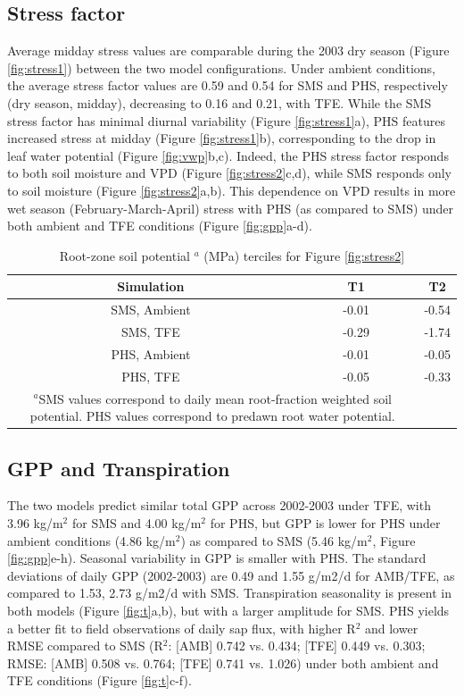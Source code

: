 \documentclass[draft,linenumbers]{agujournal}
\begin{document}
\subsection{Stress factor}
    
    Average midday stress values are comparable during the 2003 dry season (Figure \ref{fig:stress1}) between the two model configurations.
    Under ambient conditions, the average stress factor values are 0.59 and 0.54 for SMS and PHS, respectively (dry season, midday), 
    decreasing to 0.16 and 0.21, with TFE.
    While the SMS stress factor has minimal diurnal variability (Figure \ref{fig:stress1}a),
    PHS features increased stress at midday (Figure \ref{fig:stress1}b), corresponding to the drop in leaf water potential (Figure \ref{fig:vwp}b,c).
    Indeed, the PHS stress factor responds to both soil moisture and VPD (Figure \ref{fig:stress2}c,d), while SMS responds only to soil moisture (Figure \ref{fig:stress2}a,b).
    This dependence on VPD results in more wet season (February-March-April) stress with PHS (as compared to SMS) under both ambient and TFE conditions (Figure \ref{fig:gpp}a-d).

\begin{table}
\caption{Root-zone soil potential $^a$ (MPa) terciles for Figure \ref{fig:stress2}}
\label{tab:tercile}
\centering
\begin{tabular}{c c c }
Simulation & T1 & T2 \\
\hline
SMS, Ambient & -0.01 & -0.54 \\
SMS, TFE & -0.29 & -1.74 \\
PHS, Ambient & -0.01 & -0.05 \\
PHS, TFE & -0.05 & -0.33 \\
\hline
\multicolumn{2}{p{.5\linewidth}}{$^{a}$SMS values correspond to daily mean root-fraction weighted soil potential.
PHS values correspond to predawn root water potential.}
\end{tabular}
\end{table}


\subsection{GPP and Transpiration}
    The two models predict similar total GPP across 2002-2003 under TFE, with 3.96 kg/m$^2$ for SMS and 4.00 kg/m$^2$ for PHS, 
    but GPP is lower for PHS under ambient conditions (4.86 kg/m$^2$) as compared to SMS (5.46 kg/m$^2$, Figure \ref{fig:gpp}e-h).
    Seasonal variability in GPP is smaller with PHS. 
    The standard deviations of daily GPP (2002-2003) are 0.49 and 1.55 g/m2/d for AMB/TFE, 
    as compared to 1.53, 2.73 g/m2/d with SMS. 
    Transpiration seasonality is present in both models (Figure \ref{fig:t}a,b), but with a larger amplitude for SMS.
    PHS yields a better fit to field observations of daily sap flux, with higher R$^2$  and lower RMSE compared to SMS (R$^2$: [AMB] 0.742 vs. 0.434; [TFE] 0.449 vs. 0.303; RMSE: [AMB] 0.508 vs. 0.764; [TFE] 0.741 vs. 1.026)
    under both ambient and TFE conditions (Figure \ref{fig:t}c-f).
\end{document}
